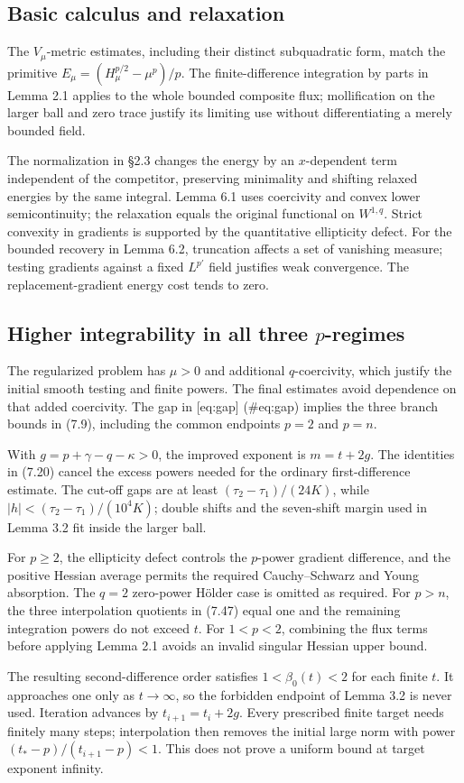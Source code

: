\documentclass[10pt]{article}
\begin{document}
\subsection*{Basic calculus and relaxation}
The \(V_\mu\)-metric estimates, including their distinct subquadratic form, match the primitive \(E_\mu=(H_\mu^{p/2}-\mu^p)/p\). The finite-difference integration by parts in Lemma 2.1 applies to the whole bounded composite flux; mollification on the larger ball and zero trace justify its limiting use without differentiating a merely bounded field.\par
The normalization in §2.3 changes the energy by an \(x\)-dependent term independent of the competitor, preserving minimality and shifting relaxed energies by the same integral. Lemma 6.1 uses coercivity and convex lower semicontinuity; the relaxation equals the original functional on \(W^{1,q}\). Strict convexity in gradients is supported by the quantitative ellipticity defect. For the bounded recovery in Lemma 6.2, truncation affects a set of vanishing measure; testing gradients against a fixed \(L^{p'}\) field justifies weak convergence. The replacement-gradient energy cost tends to zero.\par
\subsection*{Higher integrability in all three \(p\)-regimes}
The regularized problem has \(\mu>0\) and additional \(q\)-coercivity, which justify the initial smooth testing and finite powers. The final estimates avoid dependence on that added coercivity. The gap in [eq:gap] (\#eq:gap) implies the three branch bounds in (7.9), including the common endpoints \(p=2\) and \(p=n\).\par
With \(g=p+\gamma-q-\kappa>0\), the improved exponent is \(m=t+2g\). The identities in (7.20) cancel the excess powers needed for the ordinary first-difference estimate. The cut-off gaps are at least \((\tau_2-\tau_1)/(24K)\), while \(|h|<(\tau_2-\tau_1)/(10^4K)\); double shifts and the seven-shift margin used in Lemma 3.2 fit inside the larger ball.\par
For \(p\geq2\), the ellipticity defect controls the \(p\)-power gradient difference, and the positive Hessian average permits the required Cauchy–Schwarz and Young absorption. The \(q=2\) zero-power Hölder case is omitted as required. For \(p>n\), the three interpolation quotients in (7.47) equal one and the remaining integration powers do not exceed \(t\). For \(1<p<2\), combining the flux terms before applying Lemma 2.1 avoids an invalid singular Hessian upper bound.\par
The resulting second-difference order satisfies \(1<\beta_0(t)<2\) for each finite \(t\). It approaches one only as \(t\to\infty\), so the forbidden endpoint of Lemma 3.2 is never used. Iteration advances by \(t_{i+1}=t_i+2g\). Every prescribed finite target needs finitely many steps; interpolation then removes the initial large norm with power \((t_*-p)/(t_{i+1}-p)<1\). This does not prove a uniform bound at target exponent infinity.\par
\end{document}
